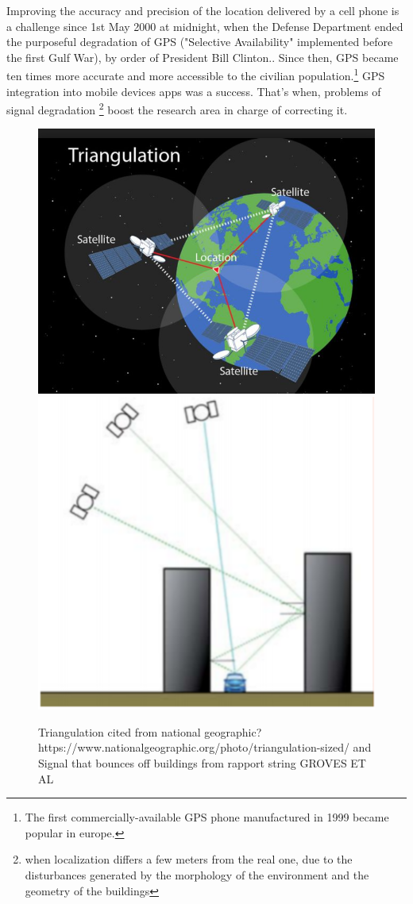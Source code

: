 \documentclass[10pt]{article}
\begin{document}
\setlength{\parindent}{10ex} Improving the accuracy and precision of the location delivered by a cell phone is a challenge since 1st May 2000 at midnight, when the Defense Department ended the purposeful degradation of GPS ("Selective Availability" implemented before the first Gulf War), by order of President Bill Clinton.\cite{canales2018navigating}. Since then, GPS became ten times more accurate and more accessible to the civilian population.\footnote{The first commercially-available GPS phone manufactured in 1999 became popular in europe.} GPS integration into mobile devices apps was a success. That's when, problems of signal degradation \footnote{when localization differs a few meters from the real one, due to the disturbances generated by the morphology of the environment and the geometry of the buildings} boost the research area in charge of correcting it.
\begin{figure}[h]
      	\centering
        \includegraphics[scale=0.4]{triangulation.PNG}
        \includegraphics[scale=0.5]{rebota.PNG}
        \caption{Triangulation cited from national geographic? https://www.nationalgeographic.org/photo/triangulation-sized/ and Signal that bounces off buildings from rapport string GROVES ET AL}
\end{figure}
\end{document}
